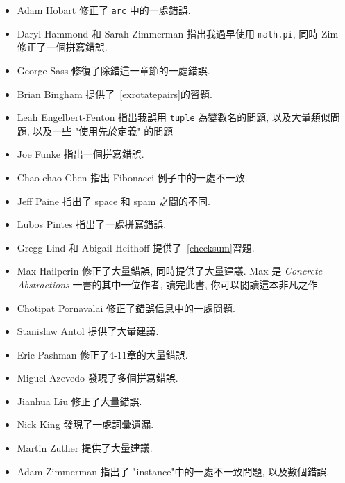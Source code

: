 \documentclass[10pt]{book}
\begin{document}
\begin{itemize}
\item Adam Hobart 修正了 {\tt arc} 中的一處錯誤. 

\item Daryl Hammond 和 Sarah Zimmerman 指出我過早使用 {\tt math.pi}, 
同時 Zim 修正了一個拼寫錯誤. 

\item George Sass 修復了除錯這一章節的一處錯誤. 

\item Brian Bingham 提供了~\ref{exrotatepairs}的習題. 

\item Leah Engelbert-Fenton 指出我誤用 {\tt tuple} 為變數名的問題, 
以及大量類似問題, 以及一些 "使用先於定義" 的問題

\item Joe Funke 指出一個拼寫錯誤. 

\item Chao-chao Chen 指出 Fibonacci 例子中的一處不一致. 

\item Jeff Paine 指出了 space 和 spam 之間的不同. 

\item Lubos Pintes 指出了一處拼寫錯誤. 

\item Gregg Lind 和 Abigail Heithoff 提供了~\ref{checksum}習題. 

\item Max Hailperin 修正了大量錯誤, 同時提供了大量建議. 
Max 是 {\em Concrete Abstractions} 一書的其中一位作者, 讀完此書, 
你可以閱讀這本非凡之作. 

\item Chotipat Pornavalai 修正了錯誤信息中的一處問題. 

\item Stanislaw Antol 提供了大量建議. 

\item Eric Pashman 修正了4-11章的大量錯誤. 

\item Miguel Azevedo 發現了多個拼寫錯誤. 

\item Jianhua Liu 修正了大量錯誤. 

\item Nick King 發現了一處詞彙遺漏. 

\item Martin Zuther 提供了大量建議. 

\item Adam Zimmerman 指出了 "instance"中的一處不一致問題, 以及數個錯誤. 


\end{itemize}
\end{document}
